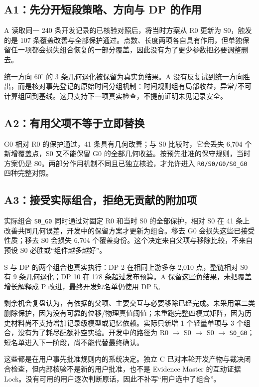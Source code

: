 \subsection{A1：先分开短段策略、方向与 DP 的作用}
A 读取同一 240 条开发记录的已核验对照后，将当时方案从 R0 更新为 S0，触发的是 107 条覆盖改善与全部保护通过。点数、长度两项各自具有作用，但单独保留任一项都会损失组合恢复的一部分覆盖，因此没有为了更少参数把必要调整删去。

统一方向 $60^\circ$ 的 3 条几何退化被保留为真实负结果。A 没有反复试到统一方向胜出，而是核对事先登记的原始时间分组机制：时间规则组有局部收益，异常/不可计算组回到基线。这只支持下一项真实检查，不提前证明未见记录安全。

\subsection{A2：有用父项不等于立即替换}
G0 相对 R0 的保护通过，41 条具有几何改善；与 S0 比较时，它会丢失 6,704 个新增覆盖点，S0 又不能保留 G0 的全部几何收益。按预先批准的保守规则，当时方案仍是 S0。两部分作用机制不同且已独立核验，才允许进入 \texttt{R0/S0/G0/S0\_G0} 四种完整对照。

\subsection{A3：接受实际组合，拒绝无贡献的附加项}
实际组合 \texttt{S0\_G0} 同时通过对固定 R0 和当时 S0 的全部保护，相对 S0 在 41 条上改善共同几何误差，开发中的保留方案才更新为组合。移去 G0 会损失这些已接受性质；移去 S0 会损失 6,704 个覆盖身份。这个决定来自父项与移除比较，不来自预设 S0 必胜或“组件越多越好”。

S 与 DP 的两个组合也真实执行：DP 2 在相同上游多存 2,010 点，整链相对 S0 有 9 条几何退化；DP 10 在 178 条超过发布预算。A 保留这些负结果，未把覆盖增长解释成 P 改进，最终开发短名单仍使用 DP 5。

剩余机会复盘认为，有依据的父项、主要交互与必要移除已经完成。未采用第二类删除保护，因为没有可靠的位移/物理真值阈值；未重跑完整四模式矩阵，因为历史材料尚不支持增加记录级模型或记忆依赖。实际只新增 1 个轻量单项与 3 个组合，没有为了耗尽配额补空实验。开发中的路径为 R0 $\rightarrow$ S0 $\rightarrow$ S0 $\rightarrow$ \texttt{S0\_G0}；短名单进入下一阶段，尚不能代替最终确认。

这些都是在用户事先批准规则内的系统决定。独立 C 已对本轮开发产物与裁决闭合检查，但内部核验不是新的用户批准，也不是 Evidence Master 的互动证据 Lock。没有可用的用户逐次判断原话，因此不补写“用户选中了组合”。
